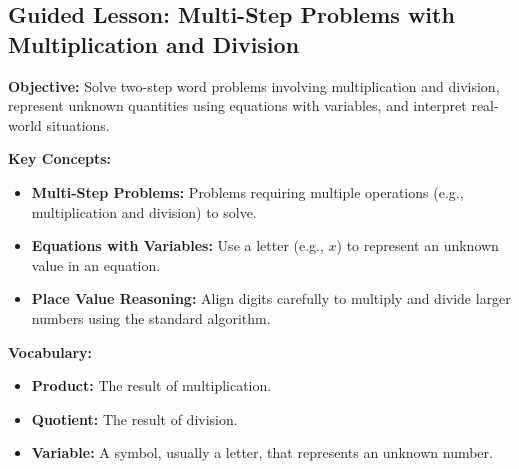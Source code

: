\documentclass[12pt]{article}
\title{}
\date{}
\begin{document}
\subsection*{Guided Lesson: Multi-Step Problems with Multiplication and Division}
\onehalfspacing

\begin{tcolorbox}[colframe=black!40, colback=gray!5, 
coltitle=black, colbacktitle=black!20, fonttitle=\bfseries\Large, 
title=Learning Objective, halign title=center, left=5pt, right=5pt, top=5pt, bottom=15pt]
\textbf{Objective:} Solve two-step word problems involving multiplication and division, represent unknown quantities using equations with variables, and interpret real-world situations.
\end{tcolorbox}

\vspace{1em}

\begin{tcolorbox}[colframe=black!60, colback=white, 
coltitle=black, colbacktitle=black!15, fonttitle=\bfseries\Large, 
title=Key Concepts and Vocabulary, halign title=center, left=10pt, right=10pt, top=10pt, bottom=15pt]
\textbf{Key Concepts:}
\begin{itemize}
    \item \textbf{Multi-Step Problems:} Problems requiring multiple operations (e.g., multiplication and division) to solve.
    \item \textbf{Equations with Variables:} Use a letter (e.g., \( x \)) to represent an unknown value in an equation.
    \item \textbf{Place Value Reasoning:} Align digits carefully to multiply and divide larger numbers using the standard algorithm.
\end{itemize}

\textbf{Vocabulary:}
\begin{itemize}
    \item \textbf{Product:} The result of multiplication.
    \item \textbf{Quotient:} The result of division.
    \item \textbf{Variable:} A symbol, usually a letter, that represents an unknown number.
\end{itemize}
\end{tcolorbox}

\vspace{1em}
\end{document}

